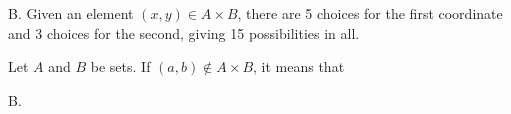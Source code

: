 \documentclass[addpoints]{exam}
\begin{document}
\begin{questions}
	
	\begin{solution}
		B. Given an element $(x,y) \in A \times B$, there are 5 choices for the first coordinate and 3 choices for the second, giving 15 possibilities in all. 
	\end{solution}
	
\question[2] Let $A$ and $B$ be sets. If $(a,b) \not \in A \times B$, it means that

\begin{solution}
	B. 
\end{solution}


\end{questions}
\end{document}
